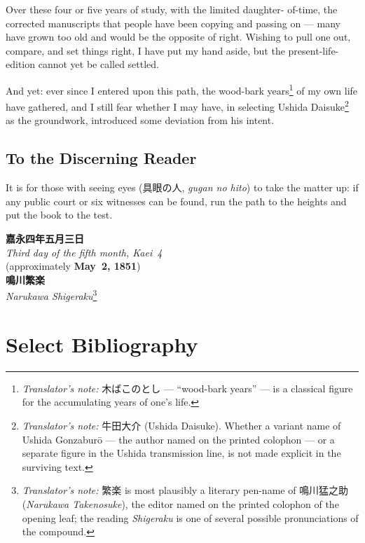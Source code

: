 \documentclass[10pt, openany]{book}
\newcommand{\jp}[1]{{\japanesefont #1}}
\newcommand{\tn}[1]{\footnote{\textit{Translator's note:} #1}}
\newcommand{\jt}[2]{\jp{#1} (\textit{#2})}
\begin{document}
Over these four or five years of study, with the limited daughter-
of-time, the corrected manuscripts that people have been copying
and passing on --- many have grown too old and would be the
opposite of right. Wishing to pull one out, compare, and set things
right, I have put my hand aside, but the present-life-edition
cannot yet be called settled.

And yet: ever since I entered upon this path, the wood-bark years\tn{%
\jp{木ばこのとし} --- ``wood-bark years'' --- is a classical figure
for the accumulating years of one's life.}
of my own life have gathered, and I still fear whether I may have,
in selecting Ushida Daisuke\tn{\jp{牛田大介} (Ushida Daisuke).
Whether a variant name of Ushida Gonzabur\=o --- the author named
on the printed colophon --- or a separate figure in the Ushida
transmission line, is not made explicit in the surviving text.} as
the groundwork, introduced some deviation from his intent.

\section{To the Discerning Reader}

It is for those with seeing eyes (\jp{具眼の人}, \textit{gugan no
hito}) to take the matter up: if any public court or six
witnesses can be found, run the path to the heights and put the
book to the test.

\begin{center}
\textbf{\jp{嘉永四年五月三日}}\\[0.2em]
\textit{Third day of the fifth month, Kaei~4}\\[0.1em]
(approximately \textbf{May~2, 1851})\\[0.7em]
\textbf{\jp{鳴川繁楽}}\\[0.2em]
\textit{Narukawa Shigeraku}\tn{\jp{繁楽} is most plausibly a
literary pen-name of \jt{鳴川猛之助}{Narukawa Takenosuke}, the
editor named on the printed colophon of the opening leaf; the
reading \textit{Shigeraku} is one of several possible pronunciations
of the compound.}
\end{center}
\chapter*{Select Bibliography}
\end{document}
